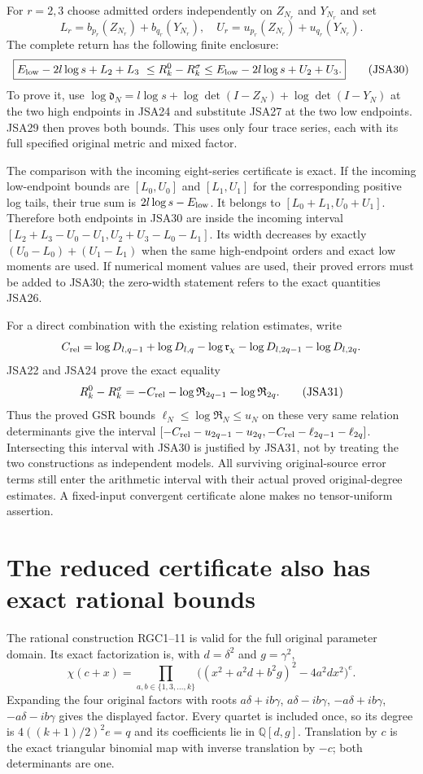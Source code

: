 \documentclass[11pt,a4paper]{article}
\begin{document}
For $r=2,3$ choose admitted orders independently on $Z_{N_r}$
and $Y_{N_r}$ and set
\[
 L_r=b_{p_r}(Z_{N_r})+b_{q_r}(Y_{N_r}),\quad
 U_r=u_{p_r}(Z_{N_r})+u_{q_r}(Y_{N_r}).
\]
The complete return has the following finite enclosure:
\[
 \boxed{
 E_{\rm low}-2l\log s+L_2+L_3
 \ \leq R_k^0-R_k^\sigma\leq
 E_{\rm low}-2l\log s+U_2+U_3.}
\tag{JSA30}
\]
To prove it, use
$\log\mathfrak d_N=l\log s+
\log\det(I-Z_N)+\log\det(I-Y_N)$
at the two high endpoints in JSA24 and substitute JSA27 at
the two low endpoints. JSA29 then proves both bounds. This
uses only four trace series, each with its full specified
original metric and mixed factor.

The comparison with the incoming eight-series certificate is
exact. If the incoming low-endpoint bounds are $[L_0,U_0]$
and $[L_1,U_1]$ for the corresponding positive log tails, their
true sum is $2l\log s-E_{\rm low}$. It belongs to
$[L_0+L_1,U_0+U_1]$. Therefore both endpoints in JSA30 are
inside the incoming interval
$[L_2+L_3-U_0-U_1,U_2+U_3-L_0-L_1]$. Its width decreases by
exactly $(U_0-L_0)+(U_1-L_1)$ when the same high-endpoint
orders and exact low moments are used. If numerical moment
values are used, their proved errors must be added to JSA30;
the zero-width statement refers to the exact quantities JSA26.

For a direct combination with the existing relation estimates,
write
\[
 C_{\rm rel}=\log D_{l,q-1}+\log D_{l,q}
       -\log\mathfrak r_\chi-\log D_{l,2q-1}-\log D_{l,2q}.
\]
JSA22 and JSA24 prove the exact equality
\[
 R_k^0-R_k^\sigma=-C_{\rm rel}
                      -\log\mathfrak R_{2q-1}-\log\mathfrak R_{2q}.
\tag{JSA31}
\]
Thus the proved GSR bounds $\ell_N\leq\log\mathfrak R_N\leq u_N$
on these very same relation determinants give the interval
$[-C_{\rm rel}-u_{2q-1}-u_{2q},
  -C_{\rm rel}-\ell_{2q-1}-\ell_{2q}]$.
Intersecting this interval with JSA30 is justified by JSA31,
not by treating the two constructions as independent models.
All surviving original-source error terms still enter the
arithmetic interval with their actual proved original-degree
estimates. A fixed-input convergent certificate alone makes
no tensor-uniform assertion.

\section{The reduced certificate also has exact rational bounds}

The rational construction RGC1--11 is valid for the full original
parameter domain. Its exact factorization is, with $d=\delta^2$
and $g=\gamma^2$,
\[
 \chi(c+x)=\prod_{a,b\in\{1,3,\ldots,k\}}
  \big((x^2+a^2d+b^2g)^2-4a^2dx^2\big)^e.
\tag{JSA32}
\]
Expanding the four original factors with roots
$a\delta+ib\gamma$, $a\delta-ib\gamma$,
$-a\delta+ib\gamma$, $-a\delta-ib\gamma$ gives the displayed
factor. Every quartet is included once, so its degree is
$4((k+1)/2)^2e=q$ and its coefficients lie in $\mathbb Q[d,g]$.
Translation by $c$ is the exact triangular binomial map with
inverse translation by $-c$; both determinants are one.
\end{document}
